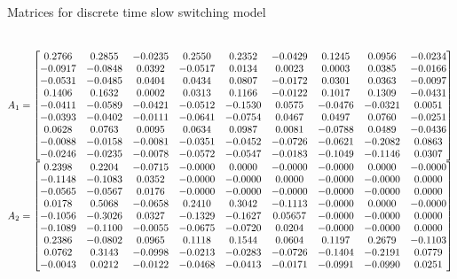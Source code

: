 \begin{table}
\caption{Matrices for discrete time slow switching model}~\label{matrices:slow}
{\scriptsize
$A_1=\left[\begin{matrix}0.2766  &  0.2855&   -0.0235&    0.2550&    0.2352&   -0.0429&    0.1245&    0.0956&   -0.0234\\
   -0.0917&   -0.0848&    0.0392&   -0.0517&    0.0134&    0.0023&    0.0003&    0.0385 &  -0.0166\\
   -0.0531&   -0.0485&    0.0404&    0.0434&    0.0807&   -0.0172&    0.0301&    0.0363&   -0.0097\\
    0.1406&    0.1632&    0.0002&    0.0313&    0.1166&   -0.0122&    0.1017&    0.1309&   -0.0431\\
   -0.0411&   -0.0589&   -0.0421&   -0.0512&   -0.1530&    0.0575&   -0.0476&   -0.0321&    0.0051\\
   -0.0393&   -0.0402&   -0.0111&   -0.0641&   -0.0754&    0.0467&    0.0497&    0.0760&   -0.0251\\
    0.0628&    0.0763&    0.0095&    0.0634&    0.0987&    0.0081&   -0.0788&    0.0489&   -0.0436\\
   -0.0088&   -0.0158&   -0.0081&   -0.0351&   -0.0452&   -0.0726&   -0.0621&   -0.2082&    0.0863\\
   -0.0246&   -0.0235&   -0.0078&   -0.0572&   -0.0547&   -0.0183&   -0.1049&   -0.1146&    0.0307\end{matrix}\right]$
$A_2=\left[\begin{matrix} 0.2398 &   0.2204&   -0.0715&   -0.0000&    0.0000&   -0.0000&   -0.0000&    0.0000&   -0.0000\\
   -0.1148&   -0.1083&    0.0352&   -0.0000&   -0.0000&    0.0000&   -0.0000&   -0.0000&    0.0000\\
   -0.0565&   -0.0567&    0.0176&   -0.0000&   -0.0000&   -0.0000&   -0.0000&   -0.0000&    0.0000\\
    0.0178&    0.5068 &  -0.0658&    0.2410&    0.3042&   -0.1113&   -0.0000&    0.0000&   -0.0000\\
   -0.1056&  -0.3026&    0.0327&   -0.1329&   -0.1627&    0.05657&   -0.0000&   -0.0000&    0.0000\\
   -0.1089&   -0.1100&   -0.0055&   -0.0675&   -0.0720&    0.0204&   -0.0000&   -0.0000&    0.0000\\
    0.2386&   -0.0802&    0.0965&    0.1118&    0.1544&    0.0604&    0.1197&    0.2679&   -0.1103\\
    0.0762&    0.3143&   -0.0998&   -0.0213&   -0.0283&   -0.0726&   -0.1404&   -0.2191&    0.0779\\
   -0.0043&    0.0212&   -0.0122&   -0.0468&   -0.0413&   -0.0171&   -0.0991&   -0.0990&    0.0251\end{matrix}\right]$
}
\end{table}
